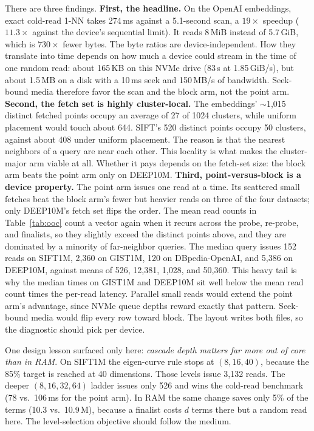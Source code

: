 \documentclass[sigconf, nonacm]{acmart}
\begin{document}
There are three findings. \textbf{First, the headline.} On the OpenAI
embeddings, exact cold-read 1-NN takes 274\,ms against a 5.1-second scan,
a $19\times$ speedup ($11.3\times$ against the device's sequential
limit).
It reads 8\,MiB instead of 5.7\,GiB, which is $730\times$ fewer bytes. The
byte ratios are device-independent. How they translate into time depends
on how much a device could stream in the time of one random read: about
165\,KB on this NVMe drive (83\,\textmu s at 1.85\,GiB/s), but about
1.5\,MB on a disk with a 10\,ms seek and 150\,MB/s of bandwidth. Seek-bound media therefore favor
the scan and the block arm, not the point arm. \textbf{Second, the fetch
set is highly cluster-local.} The embeddings' $\sim$1{,}015 distinct fetched
points occupy an average of 27 of 1024 clusters, while uniform placement
would touch about 644. SIFT's 520 distinct points occupy 50 clusters, against
about 408 under uniform placement. The reason
is that the nearest neighbors of a query are near each other. This
locality is what makes the cluster-major arm viable at all. Whether it
pays depends on the fetch-set size: the block arm beats the point arm only
on DEEP10M. \textbf{Third, point-versus-block is a device property.} The
point arm issues one read at a time. Its scattered small fetches beat the
block arm's fewer but heavier reads on three of the four datasets; only
DEEP10M's fetch set flips the order. The mean read counts in
Table~\ref{tab:ooc} count a vector again when it recurs across the probe,
re-probe, and finalists, so they slightly exceed the distinct points
above, and they are dominated by a minority of far-neighbor queries.
The median query issues 152 reads on SIFT1M,
2{,}360 on GIST1M, 120 on DBpedia-OpenAI, and 5{,}386 on DEEP10M, against
means of 526, 12{,}381, 1{,}028, and 50{,}360. This heavy tail is why the
median times on GIST1M and DEEP10M sit well below the
mean read count times the per-read latency. Parallel small reads would extend the
point arm's advantage, since NVMe queue depths reward exactly that
pattern. Seek-bound media would flip every row toward block. The layout
writes both files, so the diagnostic should pick per device.

One design lesson surfaced only here: \emph{cascade depth matters far more
out of core than in RAM}. On SIFT1M the eigen-curve rule stops at
$(8,16,40)$, because the 85\% target is reached at 40 dimensions. Those
levels issue 3{,}132 reads. The deeper $(8,16,32,64)$ ladder issues only
526 and wins the cold-read benchmark (78 vs.\ 106\,ms for the point arm). In RAM the same
change saves only 5\% of the terms (10.3 vs.\ 10.9\,M), because a
finalist costs $d$ terms there but a random read here. The
level-selection objective should follow the medium.
\end{document}
